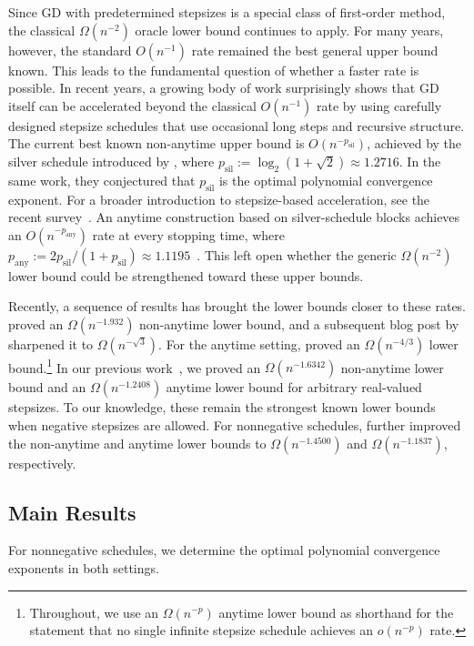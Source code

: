 \documentclass[11pt,letterpaper]{article}
\theoremstyle{definition}
\newcommand{\psil}{p_{\mathrm{sil}}}
\newcommand{\pany}{p_{\mathrm{any}}}
\begin{document}
Since GD with predetermined stepsizes is a special class of first-order method, the classical $\Omega(n^{-2})$ oracle lower bound continues to apply.
For many years, however, the standard $O(n^{-1})$ rate remained the best general upper bound known.
This leads to the fundamental question of whether a faster rate is possible.
In recent years, a growing body of work surprisingly shows that GD itself can be accelerated beyond the classical $O(n^{-1})$ rate by using carefully designed stepsize schedules that use occasional long steps and recursive structure.
The current best known non-anytime upper bound is $O(n^{-\psil})$, achieved by the silver schedule introduced by \citet{AltschulerParrilo2025}, where $\psil:=\log_2(1+\sqrt2)\approx1.2716$.
In the same work, they conjectured that $\psil$ is the optimal polynomial convergence exponent.
For a broader introduction to stepsize-based acceleration, see the recent survey~\citep{AltschulerParrilo2026Survey}.
An anytime construction based on silver-schedule blocks achieves an $O(n^{-\pany})$ rate at every stopping time, where $\pany:=2\psil/(1+\psil)\approx1.1195$~\citep{ZhangLeeDuChen2025}.
This left open whether the generic $\Omega(n^{-2})$ lower bound could be strengthened  toward these upper bounds.

Recently, a sequence of results has brought the lower bounds closer to these rates.
\citet{MaChen2026} proved an $\Omega(n^{-1.932})$ non-anytime lower bound, and a subsequent blog post by \citet{Tsai2026} sharpened it to $\Omega(n^{-\sqrt3})$.
For the anytime setting, \citet{TsaiFatkhullinZhangHe2026} proved an $\Omega(n^{-4/3})$ lower bound.\footnote{Throughout, we use an $\Omega(n^{-p})$ anytime lower bound as shorthand for the statement that no single infinite stepsize schedule achieves an $o(n^{-p})$ rate.}
In our previous work~\citep{YeLiu2026}, we proved an $\Omega(n^{-1.6342})$ non-anytime lower bound and an $\Omega(n^{-1.2408})$ anytime lower bound for arbitrary real-valued stepsizes. To our knowledge, these remain the strongest known lower bounds when negative stepsizes are allowed.
For nonnegative schedules, \citet{JungChoYun2026} further improved the non-anytime and anytime lower bounds to $\Omega(n^{-1.4500})$ and $\Omega(n^{-1.1837})$, respectively.
\subsection{Main Results}

For nonnegative schedules, we determine the optimal polynomial convergence exponents in both settings.
\end{document}
